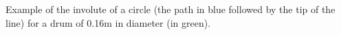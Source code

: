 \label{fig:spiral} Example of the involute of a circle (the path in blue followed by the tip of the line) for a drum of 0.16m in diameter (in green).